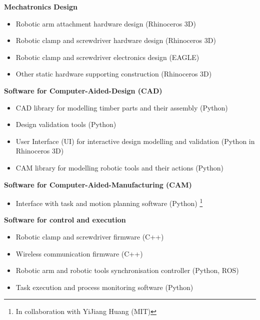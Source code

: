 \begin{description}[nosep]
	\item \textbf{Mechatronics Design}
    \begin{itemize}
    	\item Robotic arm attachment hardware design (Rhinoceros 3D) 
    	\item Robotic clamp and screwdriver hardware design (Rhinoceros 3D) 
    	\item Robotic clamp and screwdriver electronics design (EAGLE)
    	\item Other static hardware supporting construction (Rhinoceros 3D) 
    \end{itemize}
    
	\item \textbf{Software for Computer-Aided-Design (CAD)}
    \begin{itemize}
    	\item CAD library for modelling timber parts and their assembly (Python)
    	\item Design validation tools (Python)
    	\item User Interface (UI) for interactive design modelling and validation (Python in Rhinoceros 3D) 
    	\item CAM library for modelling robotic tools and their actions (Python)
    \end{itemize}
    
    \item \textbf{Software for Computer-Aided-Manufacturing (CAM)}
    \begin{itemize}
    	\item Interface with task and motion planning software (Python) \footnote{In collaboration with YiJiang Huang (MIT)}
    \end{itemize}
    
    \item \textbf{Software for control and execution}
    \begin{itemize}
    	\item Robotic clamp and screwdriver firmware (C++)
    	\item Wireless communication firmware (C++)
    	\item Robotic arm and robotic tools synchronisation controller (Python, ROS)
    	\item Task execution and process monitoring software (Python)
    \end{itemize}
\end{description}

